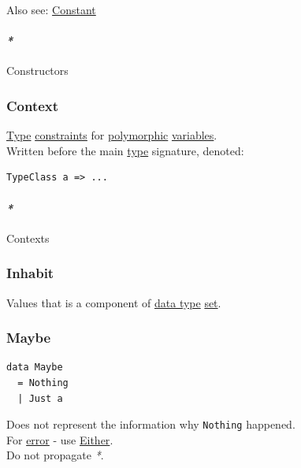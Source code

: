 \documentclass[11pt]{article}
\begin{document}
Also see: \hyperref[org74b57ec]{Constant}\\

\paragraph{\emph{*}}
\label{sec:orgfef0973}

\label{org7a9d75a}Constructors\\

\subsubsection{\label{org2ec7d4f}Context}
\label{sec:org2f7d432}
\hyperref[orgc4aea2f]{Type} \hyperref[orgcddf7a9]{constraints} for \hyperref[orgac4d581]{polymorphic} \hyperref[orge17f54f]{variables}.\\
Written before the main \hyperref[orgc4aea2f]{type} signature, denoted:\\
\begin{verbatim}
TypeClass a => ...
\end{verbatim}

\paragraph{\emph{*}}
\label{sec:org9f5bea1}

\label{orge18c92a}Contexts\\

\subsubsection{\label{orge1ae7f8}Inhabit}
\label{sec:orgd359ee2}
Values that is a component of \hyperref[org212d9c3]{data type} \hyperref[org1faf06d]{set}.\\

\subsubsection{\label{org8347bae}Maybe}
\label{sec:org2ff2827}
\begin{verbatim}
data Maybe
  = Nothing
  | Just a
\end{verbatim}

Does not represent the information why \texttt{Nothing} happened.\\
For \hyperref[org2b27c5e]{error} - use \hyperref[org6f16842]{Either}.\\
Do not propagate \emph{*}.\\
\end{document}
